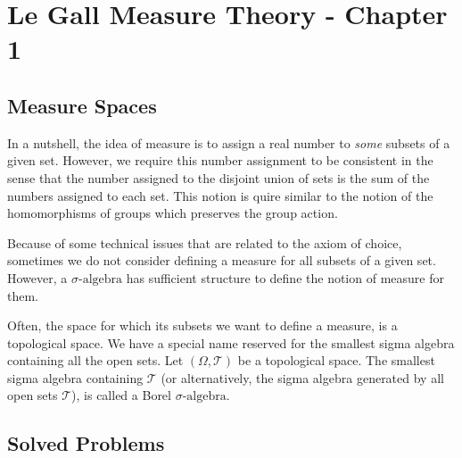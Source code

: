 \chapter{Le Gall Measure Theory - Chapter 1}



\section{Measure Spaces}
In a nutshell, the idea of measure is to assign a real number to \emph{some} subsets of a given set. However, we require this number assignment to be consistent in the sense that the number assigned to the disjoint union of sets is the sum of the numbers assigned to each set. This notion is quire similar to the notion of the homomorphisms of groups which preserves the group action.

\begin{remark}
	Because of some technical issues that are related to the axiom of choice, sometimes we do not consider defining a measure for all subsets of a given set. However, a $\sigma\text{-algebra}$ has sufficient structure to define the notion of measure for them.
\end{remark}


\begin{remark}
	Often, the space for which its subsets we want to define a measure, is a topological space. We have a special name reserved for the smallest sigma algebra containing all the open sets. Let $ (\Omega,\mathcal{T}) $ be a topological space. The smallest sigma algebra containing $ \mathcal{T} $ (or alternatively, the sigma algebra generated by all open sets $ \mathcal{T} $), is called a Borel $\sigma\text{-algebra}$.
\end{remark}



\section{Solved Problems}

